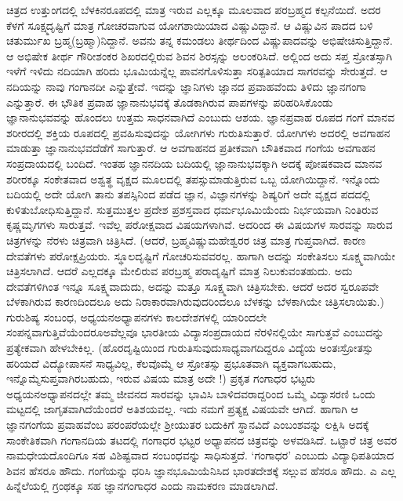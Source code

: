 {ಚಿತ್ರದ ಉತ್ತುಂಗದಲ್ಲಿ ಬೆಳಕಿನರೂಪದಲ್ಲಿ ಮಾತ್ರ ಇರುವ ಎಲ್ಲಕ್ಕೂ ಮೂಲವಾದ ಪರಬ್ರಹ್ಮದ ಕಲ್ಪನೆಯಿದೆ. ಅದರ ಕೆಳಗೆ ಸೂಕ್ಷ್ಮದೃಷ್ಟಿಗೆ ಮಾತ್ರ ಗೋಚರವಾಗುವ ಯೋಗಶಾಯಿಯಾದ ವಿಷ್ಣುವಿದ್ದಾನೆ. ಆ ವಿಷ್ಣುವಿನ ಪಾದದ ಬಳಿ ಚತುರ್ಮುಖ ಬ್ರಹ್ಮ(ಬ್ರಹ್ಮಾ)ನಿದ್ದಾನೆ. ಅವನು ತನ್ನ ಕಮಂಡಲು ತೀರ್ಥದಿಂದ ವಿಷ್ಣುಪಾದವನ್ನು ಅಭಿಷೇಚಿಸುತ್ತಿದ್ದಾನೆ. ಆ ಅಭಿಷೇಕ ತೀರ್ಥ ಗೌರೀಶಂಕರ ಶಿಖರದಲ್ಲಿರುವ ಶಿವನ ಶಿರಸ್ಸನ್ನು ಅಲಂಕರಿಸಿದೆ. ಅಲ್ಲಿಂದ ಅದು ಸಪ್ತ ಸ್ರೋತಸ್ಸಾಗಿ ಇಳೆಗೆ ಇಳಿದು ನದಿಯಾಗಿ ಹರಿದು ಭೂಮಿಯನ್ನೆಲ್ಲ ಪಾವನಗೊಳಿಸುತ್ತಾ ಸರಿತ್ಪತಿಯಾದ ಸಾಗರವನ್ನು ಸೇರುತ್ತದೆ. ಆ ನದಿಯನ್ನು ನಾವು ಗಂಗಾನದೀ ಎನ್ನುತ್ತೇವೆ. ಇದನ್ನು ಜ್ಞಾನಿಗಳು ಜ್ಞಾನದ ಪ್ರವಾಹವೆಂದು ತಿಳಿದು ಜ್ಞಾನಗಂಗಾ ಎನ್ನುತ್ತಾರೆ. ಈ ಭೌತಿಕ ಪ್ರವಾಹ ಜ್ಞಾನಾನುಭವಕ್ಕೆ ತೊಡಕಾಗಿರುವ ಪಾಪಗಳನ್ನು ಪರಿಹರಿಸಿಕೊಂಡು ಜ್ಞಾನಾನುಭವವನ್ನು ಹೊಂದಲು ಉತ್ತಮ ಸಾಧನವಾಗಿದೆ \enginline{-}ಎಂಬುದು ಆಶಯ.  ಜ್ಞಾನಪ್ರವಾಹ ರೂಪದ ಗಂಗೆ ಮಾನವ ಶರೀರದಲ್ಲಿ ಶಕ್ತಿಯ ರೂಪದಲ್ಲಿ ಪ್ರವಹಿಸುವುದನ್ನು ಯೋಗಿಗಳು ಗುರುತಿಸುತ್ತಾರೆ. ಯೋಗಿಗಳು ಅದರಲ್ಲಿ ಅವಗಾಹನ ಮಾಡುತ್ತಾ ಜ್ಞಾನಾನುಭವದೆಡೆಗೆ ಸಾಗುತ್ತಾರೆ. ಆ ಅವಗಾಹನದ ಪ್ರತೀಕವಾಗಿ ಬೌತಿಕವಾದ ಗಂಗೆಯ ಅವಗಾಹನ ಸಂಪ್ರದಾಯದಲ್ಲಿ ಬಂದಿದೆ. ಇಂತಹ ಜ್ಞಾನನದಿಯ ಬದಿಯಲ್ಲಿ ಜ್ಞಾನಾನುಭವಕ್ಕಾಗಿ ಅದಕ್ಕೆ ಪೋಷಕವಾದ ಮಾನವ ಶರೀರಕ್ಕೂ ಸಂಕೇತವಾದ ಅಶ್ವತ್ಥ ವೃಕ್ಷದ ಮೂಲದಲ್ಲಿ ತಪಸ್ಸುಮಾಡುತ್ತಿರುವ ಒಬ್ಬ ಯೋಗಿಯಿದ್ದಾನೆ. ಇನ್ನೊಂದು ಬದಿಯಲ್ಲಿ ಅದೇ ಯೋಗಿ ತಾನು ತಪಸ್ಸಿನಿಂದ ಪಡೆದ ಜ್ಞಾನ, ವಿಜ್ಞಾನಗಳನ್ನು ಶಿಷ್ಯರಿಗೆ ಅದೇ ವೃಕ್ಷದ ಪದದಲ್ಲಿ ಕುಳಿತು\break ಬೋಧಿಸುತ್ತಿದ್ದಾನೆ. ಸುತ್ತಮುತ್ತಲ ಪ್ರದೇಶ ಪ್ರಶಸ್ತವಾದ ಧರ್ಮಭೂಮಿಯೆಂದು ನಿರ್ಭಯವಾಗಿ ನಿಂತಿರುವ ಕೃಷ್ಣಮೃಗಗಳು ಸಾರುತ್ತವೆ.  ಇವೆಲ್ಲ ಪರೋಕ್ಷವಾದ ವಿಷಯಗಳಾಗಿವೆ. ಅದರಿಂದ ಈ ವಿಷಯಗಳ ಸಾರವನ್ನು ಸಾರುವ ಚಿತ್ರಗಳನ್ನು ನೆರಳು ಚಿತ್ರವಾಗಿ ಚಿತ್ರಿಸಿದೆ. (ಆದರೆ, ಬ್ರಹ್ಮವಿಷ್ಣುಮಹೇಶ್ವರರ ಚಿತ್ರ ಮಾತ್ರ ಗುಪ್ತವಾಗಿದೆ. ಕಾರಣ ದೇವತೆಗಳು ಪರೋಕ್ಷಪ್ರಿಯರು. ಸ್ಥೂಲದೃಷ್ಟಿಗೆ ಗೋಚರಿಸುವವರಲ್ಲ. ಹಾಗಾಗಿ ಅದನ್ನು ಸಂಕೇತಿಸಲು ಸೂಕ್ಷ್ಮವಾಗಿಯೇ ಚಿತ್ರಿಸಲಾಗಿದೆ. ಆದರೆ ಎಲ್ಲದಕ್ಕೂ ಮೇಲಿರುವ ಪರಬ್ರಹ್ಮ ಪರಾದೃಷ್ಟಿಗೆ ಮಾತ್ರ ನಿಲುಕುವಂತಹುದು. ಅದು ದೇವತೆಗಳಿಗಿಂತ ಇನ್ನೂ ಸೂಕ್ಷ್ಮವಾದುದು, ಅದನ್ನು ಮತ್ತೂ ಸೂಕ್ಷ್ಮವಾಗಿ ಚಿತ್ರಿಸಬೇಕು. ಆದರೆ ಅದರ ಸ್ವರೂಪವೇ ಬೆಳಕಾಗಿರುವ ಕಾರಣದಿಂದಲೂ ಅದು ನಿರಾಕಾರವಾಗಿರುವುದರಿಂದಲೂ ಬೆಳಕನ್ನು ಬೆಳಕಾಗಿಯೇ ಚಿತ್ರಿಸಲಾಯಿತು.)  ಗುರು\enginline{-}ಶಿಷ್ಯ ಸಂಬಂಧ, ಅಧ್ಯಯನ\enginline{-}ಅಧ್ಯಾಪನಗಳು ಕಾಲ\enginline{-}ದೇಶಗಳಲ್ಲಿ ಯಾರಿಂದಲೇ ಸಂಪನ್ನವಾಗುತ್ತಿವೆಯೆಂದರೂ\break ಅವೆಲ್ಲವೂ ಭಾರತೀಯ ವಿದ್ಯಾಸಂಪ್ರದಾಯದ ನೆರಳಿನಲ್ಲಿಯೇ ಸಾಗುತ್ತವೆ ಎಂಬುದನ್ನು ಪ್ರತ್ಯೇಕವಾಗಿ ಹೇಳಬೇಕಿಲ್ಲ. (ಹೊರದೃಷ್ಟಿಯಿಂದ ಗುರುತಿಸುವುದು\break ಸಾಧ್ಯವಾಗದಿದ್ದರೂ ವಿದ್ಯೆಯ ಅಂತಃಸ್ರೋತಸ್ಸು ಹರಿಯದೆ ವಿದ್ಯೋಪಾಸನೆ ಸಾಧ್ಯವಿಲ್ಲ, ಕೆಲವೊಮ್ಮೆ ಆ ಸ್ರೋತಸ್ಸು ಪ್ರಭೂತವಾಗಿ ವ್ಯಕ್ತವಾಗಬಹುದು, ಇನ್ನೊಮ್ಮೆ\break ಸುಪ್ತವಾಗಿರಬಹುದು, ಇರುವ ವಿಷಯ ಮಾತ್ರ ಅದೇ !) ಪ್ರಕೃತ ಗಂಗಾಧರ ಭಟ್ಟರು ಅಧ್ಯಯನ\enginline{-}ಅಧ್ಯಾಪನದಲ್ಲೇ ತಮ್ಮ ಜೀವನದ ಸಾರವನ್ನು ಭಾವಿಸಿ ಬಾಳಿದವರಾದ್ದರಿಂದ ಒಮ್ಮೆ ವಿದ್ಯಾಸರಣಿ ಒಂದು ಮಟ್ಟದಲ್ಲಿ ಜಾಗೃತವಾಗಿದೆಯೆಂದರೆ ಅತಿಶಯವಲ್ಲ. ಇದು ನಮಗೆ ಪ್ರತ್ಯಕ್ಷ ವಿಷಯವೇ ಆಗಿದೆ. ಹಾಗಾಗಿ ಆ ಜ್ಞಾನಗಂಗೆಯ ಪ್ರವಾಹವೆಂಬ ಪರಂಪರೆಯಲ್ಲೇ ಶ್ರೀಯುತರ ಬದುಕಿಗೆ ಸ್ಥಾನವಿದೆ ಎಂಬಂಶವನ್ನು ಲಕ್ಷಿಸಿ ಅದಕ್ಕೆ ಸಾಂಕೇತಿಕವಾಗಿ ಗಂಗಾನದಿಯ ತಟದಲ್ಲಿ ಗಂಗಾಧರ ಭಟ್ಟರ ಅಧ್ಯಾಪನದ ಚಿತ್ರವನ್ನು ಅಳವಡಿಸಿದೆ. ಒಟ್ಟಾರೆ ಚಿತ್ರ ಅವರ ನಾಮಧೇಯದೊಂದಿಗೂ ಸಹ ವಿಶಿಷ್ಟವಾದ ಸಂಬಂಧವನ್ನು ಸಾಧಿಸುತ್ತದೆ. ‘ಗಂಗಾಧರ’ ಎಂಬುದು ವಿದ್ಯಾಧಿಪತಿಯಾದ ಶಿವನ ಹೆಸರೂ ಹೌದು. ಗಂಗೆಯನ್ನು ಧರಿಸಿ ಜ್ಞಾನಭೂಮಿಯೆನಿಸಿದ ಭಾರತದೇಶಕ್ಕೆ ಸಲ್ಲುವ ಹೆಸರೂ ಹೌದು. ಎ ಎಲ್ಲ ಹಿನ್ನೆಲೆಯಲ್ಲಿ ಗ್ರಂಥಕ್ಕೂ ಸಹ ಜ್ಞಾನಗಂಗಾಧರ ಎಂದು ನಾಮಕರಣ ಮಾಡಲಾಗಿದೆ. 

}
